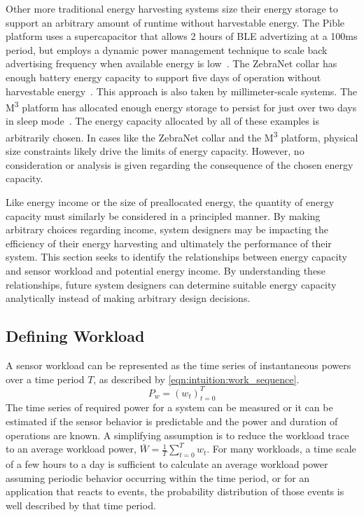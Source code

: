 Other more traditional energy harvesting systems size their energy storage to support an arbitrary amount of runtime without harvestable energy. 
The Pible platform uses a supercapacitor that allows 2 hours of BLE advertizing at a 100ms period, but employs a dynamic power management technique to scale back advertising frequency when available energy is low~\cite{fraternali2018pible}.
The ZebraNet collar has enough battery energy capacity to support five days of operation without harvestable energy~\cite{juang2002energy}. 
This approach is also taken by millimeter-scale systems. The M\textsuperscript{3} platform has allocated enough energy storage to persist for just over two days in sleep mode~\cite{lee2013modular}.
The energy capacity allocated by all of these examples is arbitrarily chosen. 
In cases like the ZebraNet collar and the M\textsuperscript{3} platform, physical size constraints likely drive the limits of energy capacity.
However, no consideration or analysis is given regarding the consequence of the chosen energy capacity.

Like energy income or the size of preallocated energy, the quantity of energy capacity must similarly be considered in a principled manner.
By making arbitrary choices regarding income, system designers may be impacting the efficiency of their energy harvesting and ultimately the performance of their system. 
This section seeks to identify the relationships between energy capacity and sensor workload and potential energy income.
By understanding these relationships, future system designers can determine suitable energy capacity analytically
instead of making arbitrary design decisions. 

\subsection{Defining Workload}
A sensor workload can be represented as the time series of instantaneous powers over a time period $T$, as described by \cref{eqn:intuition:work_sequence}. 
\begin{equation} \label{eqn:intuition:work_sequence}
    P_w = (w_{t})^{T}_{t=0} 
\end{equation}
The time series of required power for a system can be measured or it can be estimated if the sensor behavior is predictable and the power and duration of operations are known.
A simplifying assumption is to reduce the workload trace to an average workload power, $\bar{W} = \frac{1}{T}\sum_{t=0}^T w_t$.
For many workloads, a time scale of a few hours to a day is sufficient to calculate an average workload power assuming periodic behavior occurring within the time period, or for an application that reacts to events, the probability distribution of those events is well described by that time period.


